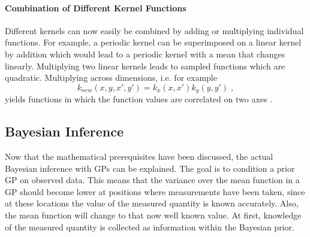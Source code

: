 \documentclass[%
  a4paper,oneside,%
  11pt,%
  smallchapters,
  style=printdev,
  extramargin,
  green,%
  rgb, <cmyk>
  ]{tubsbook}
\begin{document}
\paragraph{Combination of Different Kernel Functions}
Different kernels can now easily be combined by adding or multiplying individual functions. For example, a periodic kernel can be superimposed on a linear kernel by addition which would lead to a periodic kernel with a mean that changes linearly. Multiplying two linear kernels leads to sampled functions which are quadratic. Multiplying across dimensions, i.e. for example
\begin{equation}
k_{new}(x,y,x',y') = k_x(x,x')k_y(y,y') \;,
\end{equation}
yields functions in which the function values are correlated on two axes \cite{Duvenaud}. 

\subsection{Bayesian Inference}
Now that the mathematical prerequisites have been discussed, the actual Bayesian inference with GPs can be explained. The goal is to condition a prior GP on observed data. This means that the variance over the mean function in a GP should become lower at positions where measurements have been taken, since at these locations the value of the measured quantity is known accurately. Also, the mean function will change to that now well known value. At first, knowledge of the measured quantity is collected as information within the Bayesian prior.
\end{document}
